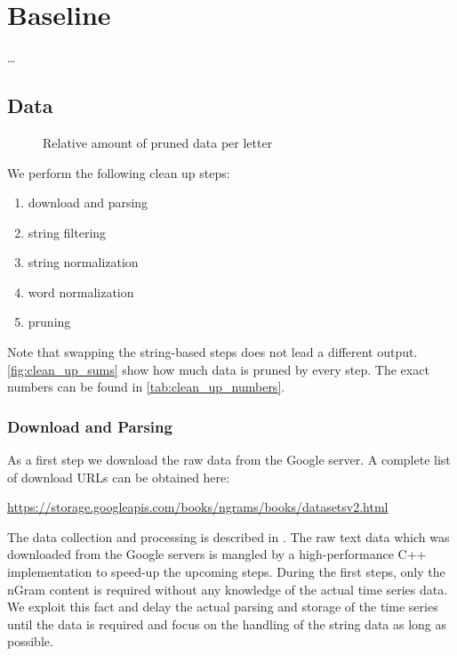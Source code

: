 \chapter{Baseline}
\label{ch:baseline}

\dots



\section{Data}
\label{sec:baseline:data}

\begin{figure}
    \centering
    
    \caption{Relative amount of pruned data per letter}
    \label{fig:clean_up_sums}
\end{figure}

We perform the following clean up steps:

\begin{enumerate}
    \itemsep0em
    \item download and parsing
    \item string filtering
    \item string normalization
    \item word normalization
    \item pruning
\end{enumerate}

Note that swapping the string-based steps does not lead a different output. \autoref{fig:clean_up_sums} show how much data is pruned by every step. The exact numbers can be found in \autoref{tab:clean_up_numbers}.


\subsection{Download and Parsing}
\label{ssec:baseline:data:download}
As a first step we download the raw data from the Google server. A complete list of download URLs can be obtained here:

\url{https://storage.googleapis.com/books/ngrams/books/datasetsv2.html}

The data collection and processing is described in \cite{Google_nGrams}. The raw text data which was downloaded from the Google servers is mangled by a high-performance C++ implementation to speed-up the upcoming steps. During the first steps, only the nGram content is required without any knowledge of the actual time series data. We exploit this fact and delay the actual parsing and storage of the time series until the data is required and focus on the handling of the string data as long as possible.


